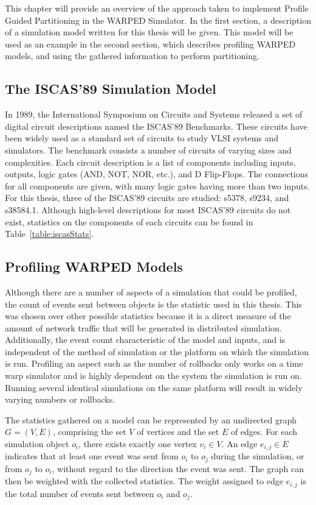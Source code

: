 \documentclass[11pt]{book}
\begin{document}
This chapter will provide an overview of the approach taken to implement Profile Guided Partitioning in the WARPED Simulator. In the first section, a description of a simulation model written for this thesis will be given. This model will be used as an example in the second section, which describes profiling WARPED models, and using the gathered information to perform partitioning. 

\subsection{The ISCAS’89 Simulation Model}

In 1989, the International Symposium on Circuits and Systems released a set of digital circuit descriptions named the ISCAS’89 Benchmarks. These circuits have been widely used as a standard set of circuits to study VLSI systems and simulators. The benchmark consists a number of circuits of varying sizes and complexities. Each circuit description is a list of components including inputs, outputs, logic gates (AND, NOT, NOR, etc.), and D Flip-Flops. The connections for all components are given, with many logic gates having more than two inputs. For this thesis, three of the ISCAS’89 circuits are studied: s5378, s9234, and s38584.1. Although high-level descriptions for most ISCAS’89 circuits do not exist, statistics on the components of each circuits can be found in Table~\ref{table:iscasStats}.

\subsection{Profiling WARPED Models}

Although there are a number of aspects of a simulation that could be profiled, the count of events sent between objects is the statistic used in this thesis. This was chosen over other possible statistics because it is a direct measure of the amount of network traffic that will be generated in distributed simulation. Additionally, the event count characteristic of the model and inputs, and is independent of the method of simulation or the platform on which the simulation is run. Profiling an aspect such as the number of rollbacks only works on a time warp simulator and is highly dependent on the system the simulation is run on. Running several identical simulations on the same platform will result in widely varying numbers or rollbacks.

The statistics gathered on a model can be represented by an undirected graph \(G = (V, E)\), comprising the set \(V\) of vertices and the set \(E\) of edges. For each simulation object \(o_i\), there exists exactly one vertex \(v_i \in V\). An edge \(e_{i,j} \in E\)  indicates that at least one event was sent from \(o_i\) to \(o_j\) during the simulation, or from \(o_j\) to \(o_i\), without regard to the direction the event was sent. The graph can then be weighted with the collected statistics. The weight assigned to edge \(e_{i,j}\) is the total number of events sent between \(o_i\) and \(o_j\). 
\end{document}
